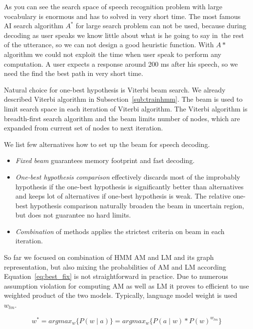 {As you can see the search space of speech recognition problem with 
large vocabulary is enormous and has to solved in very short time.
The most famous \ac{AI} search algorithm $A^*$ for large search problem can not be used,
because during decoding as user speaks we know little about what is he going to say in~the 
rest of the utterance, so we can not design a good heuristic function.
With $A*$ algorithm we could not exploit the time when user speak
to perform any computation. A user expects a response around 200 ms after his speech, 
so we need the find the best path in very short time.

Natural choice for one-best hypothesis is Viterbi beam search.\cite{huang2001spoken}
We already described Viterbi algorithm in Subsection~\ref{sub:trainhmm}.
The beam is used to limit search space in each iteration of Viterbi algorithm.
The Viterbi algorithm is breadth-first search algorithm and the beam limits 
number of nodes, which are expanded from current set of nodes to next iteration.


We list few alternatives how to set up the beam for speech decoding.
\begin{itemize}
    \item {\it Fixed beam} guarantees memory footprint and fast decoding.
    \item {\it One-best hypothesis comparison} effectively discards 
        most of the improbably hypothesis if the one-best hypothesis is significantly better than alternatives
        and keeps lot of alternatives if one-best hypothesis is weak.
        The relative one-best hypothesis comparison naturally broaden the beam in uncertain region,
        but does not guarantee no hard limits.
    \item {\it Combination} of methods applies the strictest criteria on beam in each iteration.
\end{itemize}


So far we focused on combination of \ac{HMM} \ac{AM} and \ac{LM} and its graph representation,
but also mixing the probabilities of \ac{AM} and \ac{LM} according Equation~\ref{eq:best_fix}
is not straightforward in practice. Due to numerous assumption violation for computing 
\ac{AM} as well as \ac{LM} it proves to efficient to use weighted product of the two models.
Typically, language model weight is used $w_{lm}$.

\begin{equation}\label{eq:am_lm}
    w^* = argmax_{w}\{P(w \mid a)\} = argmax_{w}\{P(a \mid w) * P(w)^{w_{lm}}\}
\end{equation}

}
